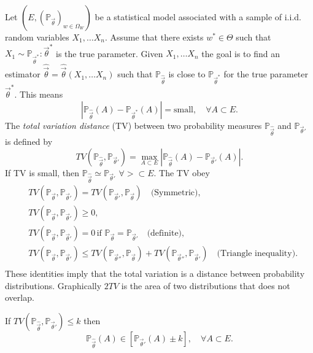 Let $(E,(\mathbb{P}_{\vec{\theta}})_{w\in \Omega_W})$ be a statistical model associated with a sample of i.i.d. random variables $X_1,\dots X_n$. Assume that there exists $w^*\in\Theta$ such that $X_1\sim \mathbb{P}_{\vec{\theta}^*}:\vec{\theta}^*$ is the true parameter. Given $X_1,\dots X_n$ the goal is to find an estimator $\hat{\vec{\theta}}=\hat{\vec{\theta}}(X_1,\dots X_n)$ such that $\mathbb{P}_{\hat{\vec{\theta}}}$ is close to $\mathbb{P}_{\vec{\theta}^*}$ for the true parameter $\vec{\theta}^*$. This means
\begin{equation}
	|\mathbb{P}_{\hat{\vec{\theta}}}(A)-\mathbb{P}_{\vec{\theta}^*}(A)|=\text{small},\quad \forall A\subset E.
\end{equation}
The \emph{total variation distance} (TV) between two probability measures $\mathbb{P}_{\hat{\vec{\theta}}}$ and $\mathbb{P}_{\vec{\theta}'}$ is defined by
\begin{equation}
	TV(\mathbb{P}_{\hat{\vec{\theta}}},\mathbb{P}_{\vec{\theta}'})=\max_{A\subset E}|\mathbb{P}_{\hat{\vec{\theta}}}(A)-\mathbb{P}_{\vec{\theta}'}(A)|.
\end{equation}
If TV is small, then $\mathbb{P}_{\hat{\vec{\theta}}}\simeq \mathbb{P}_{\vec{\theta} '}$ $\forall >\subset E$. The TV obey 
\begin{equation}
	\begin{split}
		&TV(\mathbb{P}_{\vec{\theta}},\mathbb{P}_{\vec{\theta}'})=TV(\mathbb{P}_{\vec{\theta}'},\mathbb{P}_{\vec{\theta}})\quad \text{(Symmetric)},\\
		&TV(\mathbb{P}_{\vec{\theta}},\mathbb{P}_{\vec{\theta}'})\geq 0,\\
		&TV(\mathbb{P}_{\vec{\theta}},\mathbb{P}_{\vec{\theta}'})=0\,\text{if } \mathbb{P}_{\vec{\theta}}=\mathbb{P}_{\vec{\theta}'}\quad \text{(definite)},\\
		&TV(\mathbb{P}_{\vec{\theta}},\mathbb{P}_{\vec{\theta}'})\leq TV(\mathbb{P}_{\vec{\theta}''},\mathbb{P}_{\vec{\theta}})+TV(\mathbb{P}_{\vec{\theta}''},\mathbb{P}_{\vec{\theta}'})\quad \text{(Triangle inequality)}.\\
	\end{split}
\end{equation}
These identities imply that the total variation is a distance between probability distributions. Graphically $2TV$ is the area of two distributions that does not overlap. 
\begin{example}
	If $TV(\mathbb{P}_{\hat{\vec{\theta}}},\mathbb{P}_{\vec{\theta}'})\leq k$ then
	\begin{equation}
		\mathbb{P}_{\hat{\vec{\theta}}}(A)\in [\mathbb{P}_{\vec{\theta}'}(A)\pm k], \quad \forall A\subset E.
	\end{equation}
\end{example}
